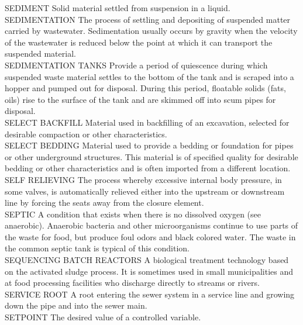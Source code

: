 \documentclass{article}
\begin{document}
SEDIMENT
Solid material settled from suspension in a liquid. 
\vspace{0.3cm}\\
SEDIMENTATION
The process of settling and depositing of suspended matter carried by wastewater. Sedimentation usually occurs by gravity when the velocity of the wastewater is reduced below the point at which it can transport the suspended material. 
\vspace{0.3cm}\\
SEDIMENTATION TANKS
Provide a period of quiescence during which suspended waste material settles to the bottom of the tank and is scraped into a hopper and pumped out for disposal. During this period, floatable solids (fats, oils) rise to the surface of the tank and are skimmed off into scum pipes for disposal.
\vspace{0.3cm}\\
SELECT BACKFILL
Material used in backfilling of an excavation, selected for desirable compaction or other characteristics. 
\vspace{0.3cm}\\
SELECT BEDDING
Material used to provide a bedding or foundation for pipes or other underground structures. This material is of specified quality for desirable bedding or other characteristics and is often imported from a different location. 
\vspace{0.3cm}\\
SELF RELIEVING
The process whereby excessive internal body pressure, in some valves, is automatically relieved either into the upstream or downstream line by forcing the seats away from the closure element.
\vspace{0.3cm}\\
SEPTIC
A condition that exists when there is no dissolved oxygen (see anaerobic). Anaerobic bacteria and other microorganisms continue to use parts of the waste for food, but produce foul odors and black colored water. The waste in the common septic tank is typical of this condition.
\vspace{0.3cm}\\
SEQUENCING BATCH REACTORS
A biological treatment technology based on the activated sludge process. It is sometimes used in small municipalities and at food processing facilities who discharge directly to streams or rivers.
\vspace{0.3cm}\\
SERVICE ROOT
A root entering the sewer system in a service line and growing down the pipe and into the sewer main. 
\vspace{0.3cm}\\
SETPOINT
The desired value of a controlled variable.
\vspace{0.3cm}\\
\end{document}

